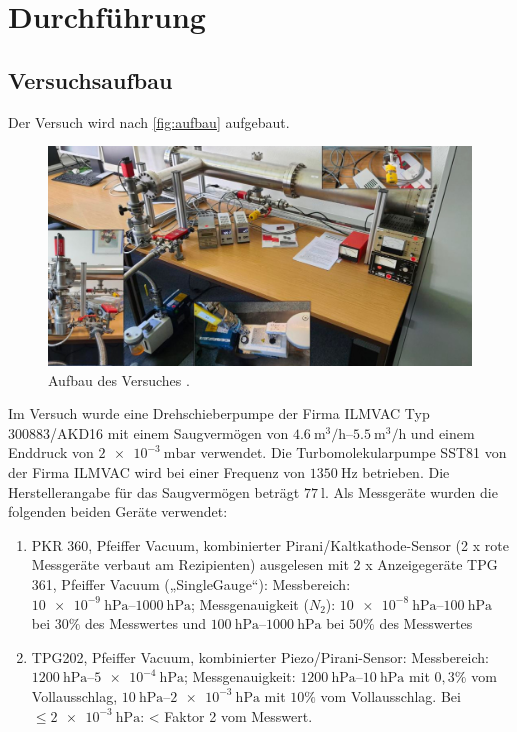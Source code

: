 \section{Durchführung}
\label{sec:Durchführung}

\subsection{Versuchsaufbau}
\label{subsec:Versuchsaufbau}

Der Versuch wird nach \autoref{fig:aufbau} aufgebaut. 
\begin{figure}[H]
    \centering
    \includegraphics[width=\textwidth]{data/Versuchsaufbau.jpeg}
    \caption{Aufbau des Versuches \cite{Anleitung70}.}
    \label{fig:aufbau}
\end{figure}

\noindent
Im Versuch wurde eine Drehschieberpumpe der Firma ILMVAC Typ 300883/AKD16 mit einem Saugvermögen von $\SIrange{4,6}{5,5}{\cubic\meter\per\hour}$ und einem Enddruck von $\SI{2 e-3}{\milli\bar}$ verwendet. \newline
Die Turbomolekularpumpe SST81 von der Firma ILMVAC wird bei einer Frequenz von $\SI{1350}{\hertz}$ betrieben. Die Herstellerangabe für das Saugvermögen beträgt $\SI{77}{\litre}$.
Als Messgeräte wurden die folgenden beiden Geräte verwendet:
\begin{enumerate}
    \item PKR 360, Pfeiffer Vacuum, kombinierter Pirani/Kaltkathode-Sensor (2 x rote Messgeräte verbaut am Rezipienten) ausgelesen mit 2 x Anzeigegeräte TPG 361, Pfeiffer Vacuum („SingleGauge“):
    Messbereich: $\SIrange{10 e-9}{1000}{\hecto\pascal}$; Messgenauigkeit ($N_2$): $\SIrange{10 e-8}{100}{\hecto\pascal}$ bei $30 \%$ des Messwertes und
    $\SIrange{100}{1000}{\hecto\pascal}$ bei $50 \%$ des Messwertes 
    \item TPG202, Pfeiffer Vacuum, kombinierter Piezo/Pirani-Sensor:
    Messbereich: $\SIrange{1200}{5 e-4}{\hecto\pascal}$; Messgenauigkeit: $\SIrange{1200}{10}{\hecto\pascal}$ mit $0,3 \%$ vom Vollausschlag, $\SIrange{10}{2 e-3}{\hecto\pascal}$ mit $10\%$ vom Vollausschlag.
    Bei $\leq \SI{2 e-3}{\hecto\pascal}$: < Faktor 2 vom Messwert.
\end{enumerate}

